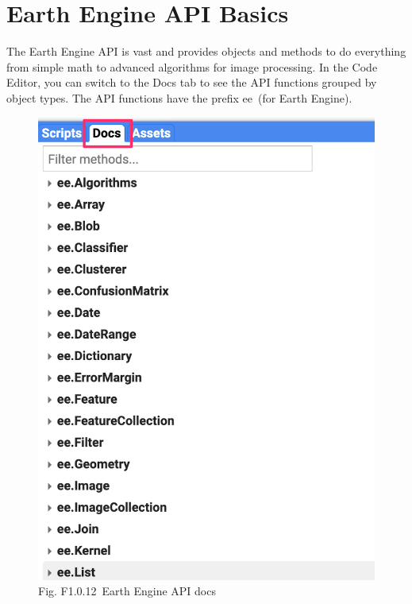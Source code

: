 \documentclass[
  letterpaper,
  DIV=11,
  numbers=noendperiod]{scrreprt}
\begin{document}
\hypertarget{earth-engine-api-basics}{%
\section{Earth Engine API Basics}\label{earth-engine-api-basics}}

The Earth Engine API is vast and provides objects and methods to do
everything from simple math to advanced algorithms for image processing.
In the Code Editor, you can switch to the Docs tab to see the API
functions grouped by object types. The API functions have the prefix
ee~(for Earth Engine).

\begin{figure}

{\centering \includegraphics{./F1/image59.png}

}

\caption{Fig. F1.0.12~Earth Engine API docs}

\end{figure}
\end{document}
